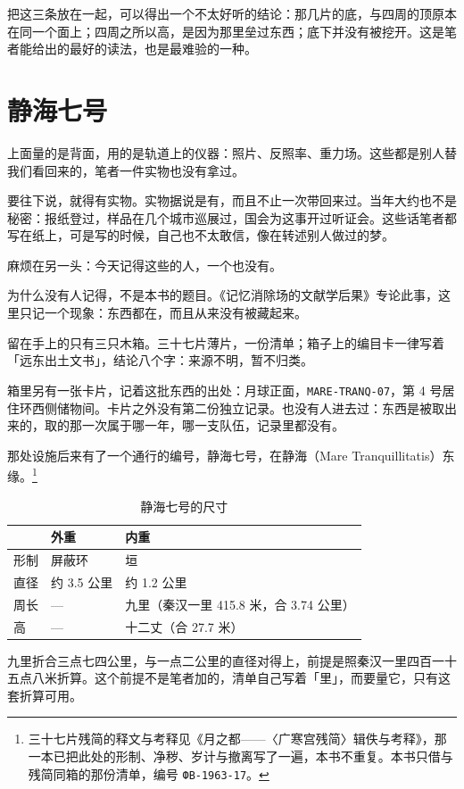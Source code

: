 把这三条放在一起，可以得出一个不太好听的结论：那几片的底，与四周的顶原本在同一个面上；四周之所以高，是因为那里垒过东西；底下并没有被挖开。这是笔者能给出的最好的读法，也是最难验的一种。


\section{静海七号}

上面量的是背面，用的是轨道上的仪器：照片、反照率、重力场。这些都是别人替我们看回来的，笔者一件实物也没有拿过。

要往下说，就得有实物。实物据说是有，而且不止一次带回来过。当年大约也不是秘密：报纸登过，样品在几个城市巡展过，国会为这事开过听证会。这些话笔者都写在纸上，可是写的时候，自己也不太敢信，像在转述别人做过的梦。

麻烦在另一头：今天记得这些的人，一个也没有。

为什么没有人记得，不是本书的题目。《记忆消除场的文献学后果》专论此事，这里只记一个现象：东西都在，而且从来没有被藏起来。

留在手上的只有三只木箱。三十七片薄片，一份清单；箱子上的编目卡一律写着「远东出土文书」，结论八个字：来源不明，暂不归类。

箱里另有一张卡片，记着这批东西的出处：月球正面，\texttt{MARE-TRANQ-07}，第 4 号居住环西侧储物间。卡片之外没有第二份独立记录。也没有人进去过：东西是被取出来的，取的那一次属于哪一年，哪一支队伍，记录里都没有。

那处设施后来有了一个通行的编号，静海七号，在静海（Mare Tranquillitatis）东缘。\footnote{三十七片残简的释文与考释见《月之都——〈广寒宫残简〉辑佚与考释》，那一本已把此处的形制、净秽、岁计与撤离写了一遍，本书不重复。本书只借与残简同箱的那份清单，编号 \texttt{ФВ-1963-17}。}

\begin{table}[htbp]
\centering
\caption{静海七号的尺寸}
\begin{tabular}{@{}lll@{}}
\toprule
 & 外重 & 内重\\
\midrule
形制 & 屏蔽环 & 垣 \\
直径 & 约 3.5 公里 & 约 1.2 公里\\
周长 & — & 九里（秦汉一里 415.8 米，合 3.74 公里）\\
高 & — & 十二丈（合 27.7 米）\\
\bottomrule
\end{tabular}
\end{table}

九里折合三点七四公里，与一点二公里的直径对得上，前提是照秦汉一里四百一十五点八米折算。这个前提不是笔者加的，清单自己写着「里」，而要量它，只有这套折算可用。

